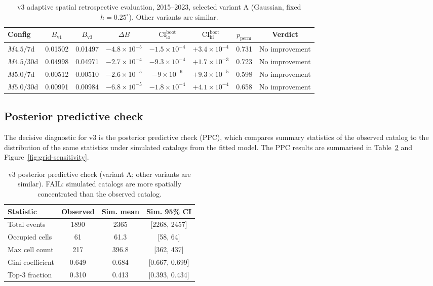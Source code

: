 \documentclass[10pt,a4paper,twocolumn]{article}
\begin{document}
\begin{table}[t]
\centering
\caption{v3 adaptive spatial retrospective evaluation, 2015--2023, selected variant A (Gaussian, fixed $h=0.25^\circ$). Other variants are similar.}\label{tab:v3-results}
\small
\begin{tabular*}{\textwidth}{@{\extracolsep{\fill}}lccccccc}
\toprule
Config & $B_{\text{v1}}$ & $B_{\text{v3}}$ & $\Delta B$ & $\text{CI}^{\text{boot}}_{\text{lo}}$ & $\text{CI}^{\text{boot}}_{\text{hi}}$ & $p_{\text{perm}}$ & Verdict \\
\midrule
$M4.5/7$d  & 0.01502 & 0.01497 & $-4.8\times10^{-5}$ & $-1.5\times10^{-4}$ & $+3.4\times10^{-4}$ & 0.731 & No improvement \\
$M4.5/30$d & 0.04998 & 0.04971 & $-2.7\times10^{-4}$ & $-9.3\times10^{-4}$ & $+1.7\times10^{-3}$ & 0.723 & No improvement \\
$M5.0/7$d  & 0.00512 & 0.00510 & $-2.6\times10^{-5}$ & $-9\times10^{-6}$ & $+9.3\times10^{-5}$ & 0.598 & No improvement \\
$M5.0/30$d & 0.00991 & 0.00984 & $-6.8\times10^{-5}$ & $-1.8\times10^{-4}$ & $+4.1\times10^{-4}$ & 0.658 & No improvement \\
\bottomrule
\end{tabular*}
\end{table}

\subsection{Posterior predictive check}

The decisive diagnostic for v3 is the posterior predictive check (PPC), which compares summary statistics of the observed catalog to the distribution of the same statistics under simulated catalogs from the fitted model. The PPC results are summarised in Table~\ref{tab:v3-ppc} and Figure~\ref{fig:grid-sensitivity}.

\begin{table}[t]
\centering
\caption{v3 posterior predictive check (variant A; other variants are similar). FAIL: simulated catalogs are more spatially concentrated than the observed catalog.}\label{tab:v3-ppc}
\small
\begin{tabular*}{\columnwidth}{@{\extracolsep{\fill}}lccc}
\toprule
Statistic & Observed & Sim. mean & Sim. 95\% CI \\
\midrule
Total events          & 1890 & 2365 & [2268, 2457] \\
Occupied cells        & 61   & 61.3 & [58, 64] \\
Max cell count        & 217  & 396.8 & [362, 437] \\
Gini coefficient      & 0.649 & 0.684 & [0.667, 0.699] \\
Top-3 fraction        & 0.310 & 0.413 & [0.393, 0.434] \\
\bottomrule
\end{tabular*}
\end{table}
\end{document}

